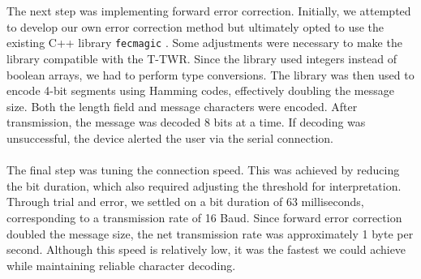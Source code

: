 \\ \\
The next step was implementing forward error correction. Initially, we attempted to develop our own error correction method but ultimately opted to use the existing C++ library \texttt{fecmagic} \cite{kristof2020}. Some adjustments were necessary to make the library compatible with the T-TWR. Since the library used integers instead of boolean arrays, we had to perform type conversions. The library was then used to encode 4-bit segments using Hamming codes, effectively doubling the message size. Both the length field and message characters were encoded. After transmission, the message was decoded 8 bits at a time. If decoding was unsuccessful, the device alerted the user via the serial connection.
\\ \\
The final step was tuning the connection speed. This was achieved by reducing the bit duration, which also required adjusting the threshold for interpretation. Through trial and error, we settled on a bit duration of 63 milliseconds, corresponding to a transmission rate of 16 Baud. Since forward error correction doubled the message size, the net transmission rate was approximately 1 byte per second. Although this speed is relatively low, it was the fastest we could achieve while maintaining reliable character decoding.

